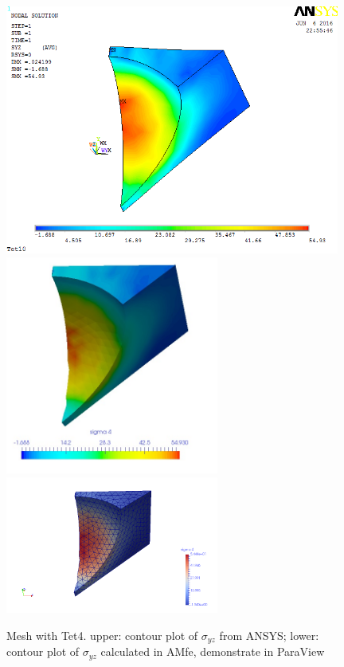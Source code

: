 \begin{figure}[htbp]
	\begin{center}
		\includegraphics[width=11cm,clip]{Tet4Syz.png} 
		\includegraphics[width=7cm,clip]{Tet4SyzPD.png} 			
		\includegraphics[width=7cm,clip]{Tet4SyzP.png} 		
		\caption{Mesh with Tet4. upper: contour plot of $\sigma_{yz}$ from ANSYS; lower: contour plot of $\sigma_{yz}$ calculated in AMfe, demonstrate in ParaView} \label{fig: Tet4Syz}
	\end{center}
\end{figure}
\clearpage 

